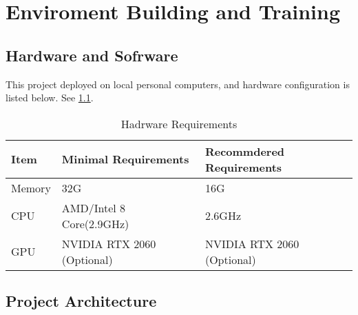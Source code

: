 
\chapter{Enviroment Building and Training} %

\label{Chapter3} %


\section{Hardware and Sofrware}
This project deployed on local personal computers, and hardware configuration is listed below. See \ref{tab:hardware}.
\begin{table}
\begin{tabular}{l l l}
\toprule
\textbf{Item} & \textbf{Minimal Requirements} & \textbf{Recommdered Requirements} \\
\midrule
Memory & 32G & 16G  \\
CPU & AMD/Intel 8 Core(2.9GHz) & 2.6GHz \\
GPU& NVIDIA RTX 2060 (Optional) & NVIDIA RTX 2060 (Optional) \\
\bottomrule
\end{tabular}
\caption{Hadrware Requirements}
\label{tab:hardware}
\end{table}

\section{Project Architecture}

